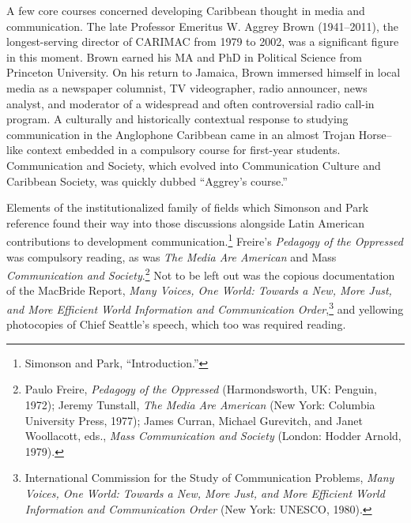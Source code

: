 \documentclass{tufte-handout}
\begin{document}
A few core courses concerned developing Caribbean thought in media and
communication. The late Professor Emeritus W. Aggrey Brown (1941--2011),
the longest-serving director of CARIMAC from 1979 to 2002, was a
significant figure in this moment. Brown earned his MA and PhD in
Political Science from Princeton University. On his return to Jamaica,
Brown immersed himself in local media as a newspaper columnist, TV
videographer, radio announcer, news analyst, and moderator of a
widespread and often controversial radio call-in program. A culturally
and historically contextual response to studying communication in the
Anglophone Caribbean came in an almost Trojan Horse--like context
embedded in a compulsory course for first-year students. Communication
and Society, which evolved into Communication Culture and Caribbean
Society, was quickly dubbed ``Aggrey's course.''

Elements of the institutionalized family of fields which Simonson and
Park reference found their way into those discussions alongside Latin
American contributions to development communication.\footnote{Simonson
  and Park, ``Introduction.''} Freire's \emph{Pedagogy of the Oppressed}
was compulsory reading, as was \emph{The Media Are American} and Mass
\emph{Communication and Society}.\footnote{Paulo Freire, \emph{Pedagogy
  of the Oppressed} (Harmondsworth, UK: Penguin, 1972); Jeremy Tunstall,
  \emph{The Media Are American} (New York: Columbia University Press,
  1977); James Curran, Michael Gurevitch, and Janet Woollacott, eds.,
  \emph{Mass Communication and Society} (London: Hodder Arnold, 1979).}
Not to be left out was the copious documentation of the MacBride Report,
\emph{Many Voices, One World: Towards a New, More Just, and More
Efficient World Information and Communication Order},\footnote{International
  Commission for the Study of Communication Problems, \emph{Many Voices,
  One World: Towards a New, More Just, and More Efficient World
  Information and Communication Order} (New York: UNESCO, 1980).} and
yellowing photocopies of Chief Seattle's speech, which too was required
reading.
\end{document}
